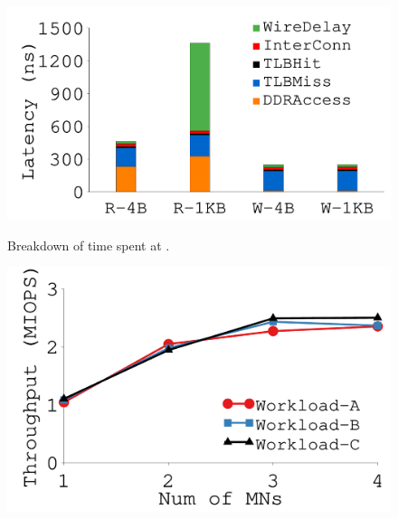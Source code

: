 {\begin{figure}[th]
\begin{minipage}{\figWidthSix}
\begin{center}
\centerline{\includegraphics[width=\columnwidth]{Figures/g_plot_latency_breakdown.pdf}}
\vspace{-0.1in}
\captionsetup{width=.9\columnwidth}
{
Breakdown of time spent at \sysboard.
}
\end{center}
\end{minipage}
\begin{minipage}{\figWidthSix}
\begin{center}
\centerline{\includegraphics[width=\columnwidth]{Figures/g_plot_ycsb_mn.pdf}}
\vspace{-0.1in}
\captionsetup{width=.9\columnwidth}
{
}
\end{center}
\end{minipage}
\vspace{-0.15in}
\end{figure}
}
